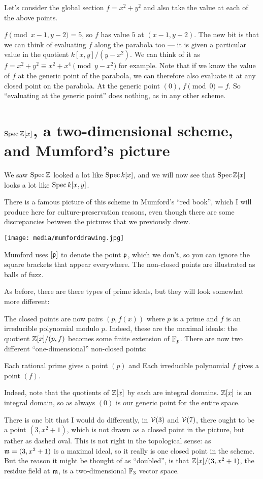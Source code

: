 Let's consider the global section $f = x^2 + y^2$
and also take the value at each of the above points.
\begin{itemize}
	\ii $f \pmod{x-1,y-2} = 5$, so $f$ has value $5$ at $(x-1, y+2)$.
	\ii The new bit is that we can think of evaluating
	$f$ along the parabola too --- it is given a particular value
	in the quotient $k[x,y] / (y-x^2)$.
	We can think of it as $f = x^2+y^2 \equiv x^2+x^4 \pmod{y-x^2}$ for example.
	Note that if we know the value of $f$ at the generic point of the parabola,
	we can therefore also evaluate it at any closed point on the parabola.
	\ii At the generic point $(0)$, $f \pmod{0} = f$.
	So ``evaluating at the generic point'' does nothing, as in any other scheme.
\end{itemize}


\section{$\operatorname{Spec} \mathbb Z[x]$, a two-dimensional scheme, and Mumford's picture}
We saw $\operatorname{Spec} \mathbb Z$ looked a lot like $\operatorname{Spec} k[x]$,
and we will now see that $\operatorname{Spec} \mathbb Z[x]$ looks a lot like $\operatorname{Spec} k[x,y]$.

There is a famous picture of this scheme in Mumford's ``red book'',
which I will produce here for culture-preservation reasons,
even though there are some discrepancies between
the pictures that we previously drew.
\begin{center}
	\texttt{[image: media/mumforddrawing.jpg]}
\end{center}
Mumford uses $[\mathfrak p]$ to denote the point $\mathfrak p$,
which we don't, so you can ignore the square brackets that appear everywhere.
The non-closed points are illustrated as balls of fuzz.

As before, there are there types of prime ideals,
but they will look somewhat more different:
\begin{itemize}
	\ii The closed points are now pairs $(p, f(x))$
	where $p$ is a prime and $f$ is an irreducible polynomial modulo $p$.
	Indeed, these are the maximal ideals:
	the quotient $\mathbb Z[x] / (p,f)$ becomes some finite extension of $\mathbb F_p$.
	\ii There are now two different ``one-dimensional'' non-closed points:
	\begin{itemize}
		\ii Each rational prime gives a point $(p)$ and
		\ii Each irreducible polynomial $f$ gives a point $(f)$.
	\end{itemize}
	Indeed, note that the quotients of $\mathbb Z[x]$ by each are integral domains.
	\ii $\mathbb Z[x]$ is an integral domain,
	so as always $(0)$ is our generic point for the entire space.
\end{itemize}
There is one bit that I would do differently,
in $\mathcal V(3)$ and $\mathcal V(7)$, there ought to be a point $(3,x^2+1)$,
which is not drawn as a closed point in the picture,
but rather as dashed oval.
This is not right in the topological sense:
as $\mathfrak m = (3, x^2+1)$ is a maximal ideal,
so it really is one closed point in the scheme.
But the reason it might be thought of as ``doubled'',
is that $\mathbb Z[x] / (3,x^2+1)$,
the residue field at $\mathfrak m$,
is a two-dimensional $\mathbb F_3$ vector space.

